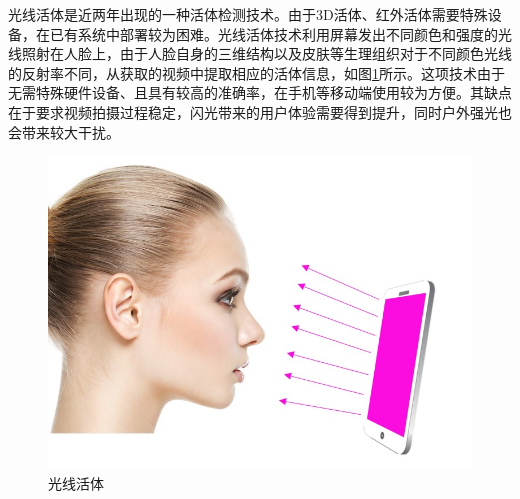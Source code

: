 光线活体是近两年出现的一种活体检测技术。由于3D活体、红外活体需要特殊设备，在已有系统中部署较为困难。光线活体技术利用屏幕发出不同颜色和强度的光线照射在人脸上，由于人脸自身的三维结构以及皮肤等生理组织对于不同颜色光线的反射率不同，从获取的视频中提取相应的活体信息，如图\ref{fig:light_reflection}所示。这项技术由于无需特殊硬件设备、且具有较高的准确率，在手机等移动端使用较为方便。其缺点在于要求视频拍摄过程稳定，闪光带来的用户体验需要得到提升，同时户外强光也会带来较大干扰\cite{liu2019aurora}。

\begin{figure}[ht]
\centering
\includegraphics[scale=0.5]{img/chapter_as/light_reflection.jpg}
\caption{光线活体}
\label{fig:light_reflection}
\end{figure}

